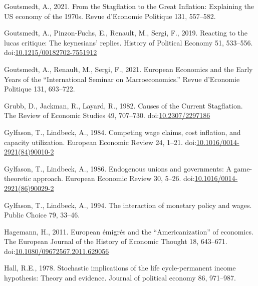 \documentclass[
  12pt,
  onecolumn]{article}
\newlength{\cslhangindent}
\newlength{\cslentryspacingunit} %
\newenvironment{CSLReferences}[2] %
 {%
  \setlength{\parindent}{0pt}
  \ifodd #1
  \let\oldpar\par
  \def\par{\hangindent=\cslhangindent\oldpar}
  \fi
  \setlength{\parskip}{#2\cslentryspacingunit}
 }%
 {}
\begin{document}
\begin{CSLReferences}{1}{0}
\leavevmode{}%
Goutsmedt, A., 2021. From the {Stagflation} to the {Great Inflation}:
{Explaining} the {US} economy of the 1970s. Revue d'Economie Politique
131, 557--582.

\leavevmode{}%
Goutsmedt, A., Pinzon-Fuchs, E., Renault, M., Sergi, F., 2019. Reacting
to the lucas critique: {The} keynesians' replies. History of Political
Economy 51, 533--556.
doi:\href{https://doi.org/10.1215/00182702-7551912}{10.1215/00182702-7551912}

\leavevmode{}%
Goutsmedt, A., Renault, M., Sergi, F., 2021. European {Economics} and
the {Early Years} of the {``{International Seminar} on
{Macroeconomics}.''} Revue d'Economie Politique 131, 693--722.

\leavevmode{}%
Grubb, D., Jackman, R., Layard, R., 1982. Causes of the {Current
Stagflation}. The Review of Economic Studies 49, 707--730.
doi:\href{https://doi.org/10.2307/2297186}{10.2307/2297186}

\leavevmode{}%
Gylfason, T., Lindbeck, A., 1984. Competing wage claims, cost inflation,
and capacity utilization. European Economic Review 24, 1--21.
doi:\href{https://doi.org/10.1016/0014-2921(84)90010-2}{10.1016/0014-2921(84)90010-2}

\leavevmode{}%
Gylfason, T., Lindbeck, A., 1986. Endogenous unions and governments: {A}
game-theoretic approach. European Economic Review 30, 5--26.
doi:\href{https://doi.org/10.1016/0014-2921(86)90029-2}{10.1016/0014-2921(86)90029-2}

\leavevmode{}%
Gylfason, T., Lindbeck, A., 1994. The interaction of monetary policy and
wages. Public Choice 79, 33--46.

\leavevmode{}%
Hagemann, H., 2011. European émigrés and the {``{Americanization}''} of
economics. The European Journal of the History of Economic Thought 18,
643--671.
doi:\href{https://doi.org/10.1080/09672567.2011.629056}{10.1080/09672567.2011.629056}

\leavevmode{}%
Hall, R.E., 1978. Stochastic implications of the life cycle-permanent
income hypothesis: Theory and evidence. Journal of political economy 86,
971--987.


\end{CSLReferences}
\end{document}
